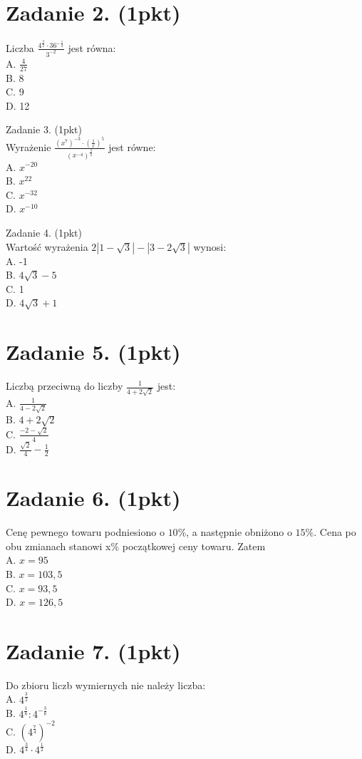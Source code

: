 \documentclass[10pt]{article}
\begin{document}
\section*{Zadanie 2. (1pkt)}
Liczba \(\frac{4^{\frac{3}{2}} \cdot 36^{-\frac{1}{2}}}{3^{-2}}\) jest równa:\\
A. \(\frac{4}{27}\)\\
B. 8\\
C. 9\\
D. 12

Zadanie 3. (1pkt)\\
Wyrażenie \(\frac{\left(x^{7}\right)^{-3} \cdot\left(\frac{1}{x}\right)^{5}}{\left(x^{-4}\right)^{\frac{3}{2}}}\) jest równe:\\
A. \(x^{-20}\)\\
B. \(x^{22}\)\\
C. \(x^{-32}\)\\
D. \(x^{-10}\)

Zadanie 4. (1pkt)\\
Wartość wyrażenia \(2|1-\sqrt{3}|-|3-2 \sqrt{3}|\) wynosi:\\
A. -1\\
B. \(4 \sqrt{3}-5\)\\
C. 1\\
D. \(4 \sqrt{3}+1\)

\section*{Zadanie 5. (1pkt)}
Liczbą przeciwną do liczby \(\frac{1}{4+2 \sqrt{2}}\) jest:\\
A. \(\frac{1}{4-2 \sqrt{2}}\)\\
B. \(4+2 \sqrt{2}\)\\
C. \(\frac{-2-\sqrt{2}}{4}\)\\
D. \(\frac{\sqrt{2}}{4}-\frac{1}{2}\)

\section*{Zadanie 6. (1pkt)}
Cenę pewnego towaru podniesiono o \(10 \%\), a następnie obniżono o \(15 \%\). Cena po obu zmianach stanowi x\% początkowej ceny towaru. Zatem\\
A. \(x=95\)\\
B. \(x=103,5\)\\
C. \(x=93,5\)\\
D. \(x=126,5\)

\section*{Zadanie 7. (1pkt)}
Do zbioru liczb wymiernych nie należy liczba:\\
A. \(4^{\frac{3}{2}}\)\\
B. \(4^{\frac{1}{8}}: 4^{-\frac{3}{8}}\)\\
C. \(\left(4^{\frac{7}{4}}\right)^{-2}\)\\
D. \(4^{\frac{3}{4}} \cdot 4^{\frac{1}{2}}\)
\end{document}
